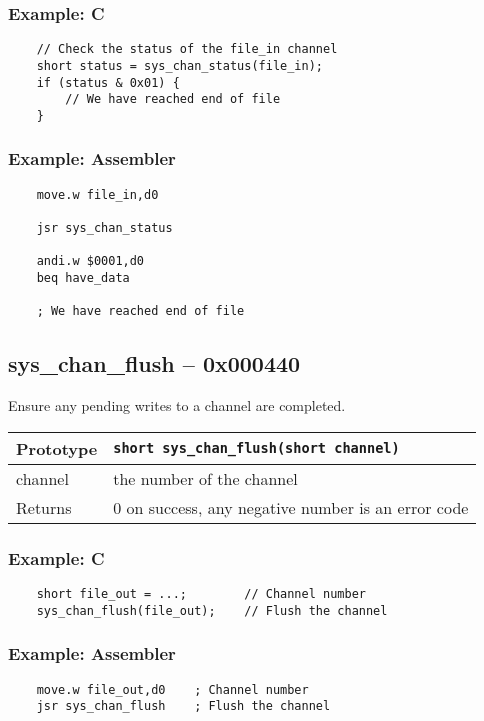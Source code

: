 \subsubsection*{Example: C}
\begin{lstlisting}
    // Check the status of the file_in channel
    short status = sys_chan_status(file_in);
    if (status & 0x01) {
        // We have reached end of file
    }
\end{lstlisting}

\subsubsection*{Example: Assembler}
\begin{verbatim}
    move.w file_in,d0

    jsr sys_chan_status

    andi.w $0001,d0
    beq have_data

    ; We have reached end of file
\end{verbatim}

\subsection*{sys\_chan\_flush -- 0x000440}
Ensure any pending writes to a channel are completed.

\bigskip

\begin{tabular}{|l||l|} \hline
Prototype & \lstinline!short sys_chan_flush(short channel)! \\ \hline
channel & the number of the channel \\ \hline
Returns & 0 on success, any negative number is an error code \\ \hline
\end{tabular}

\subsubsection*{Example: C}
\begin{lstlisting}
    short file_out = ...;        // Channel number
    sys_chan_flush(file_out);    // Flush the channel
\end{lstlisting}

\subsubsection*{Example: Assembler}
\begin{verbatim}
    move.w file_out,d0    ; Channel number
    jsr sys_chan_flush    ; Flush the channel
\end{verbatim}

